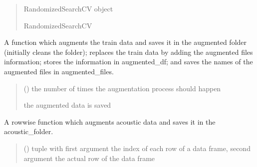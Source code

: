 \documentclass[letterpaper,10pt,english]{sphinxmanual}
\begin{document}
\begin{fulllineitems}
\begin{fulllineitems}
\begin{quote}
\begin{description}
\sphinxAtStartPar
RandomizedSearchCV object

\sphinxAtStartPar
RandomizedSearchCV

\end{description}\end{quote}

\end{fulllineitems}


\begin{fulllineitems}
\label{\detokenize{BeeClassification:BeeClassification.BeeClassification.data_augmentation_df}}
\pysigstartsignatures
{}
\pysigstopsignatures
\sphinxAtStartPar
A function which augments the train data and saves it in the augmented folder (initially cleans the folder); replaces the train data by adding the augmented files information; stores the information in augmented\_df; and saves the names of the augmented files in augmented\_files.
\begin{quote}\begin{description}
\sphinxAtStartPar
{} () \textendash{} the number of times the augmentation process should happen

\sphinxAtStartPar
the augmented data is saved

\end{description}\end{quote}

\end{fulllineitems}


\begin{fulllineitems}
\label{\detokenize{BeeClassification:BeeClassification.BeeClassification.data_augmentation_row}}
\pysigstartsignatures
{}
\pysigstopsignatures
\sphinxAtStartPar
A row\sphinxhyphen{}wise function which augments acoustic data and saves it in the acoustic\_folder.
\begin{quote}\begin{description}
\sphinxAtStartPar
{} () \textendash{} tuple with first argument the index of each row of a data frame, second argument \sphinxhyphen{} the actual row of the data frame


\end{description}
\end{quote}
\end{fulllineitems}
\end{fulllineitems}
\end{document}
